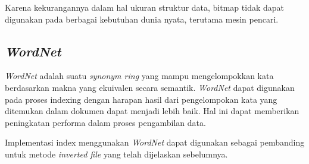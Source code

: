 Karena kekurangannya dalam hal ukuran struktur data, bitmap tidak dapat
digunakan pada berbagai kebutuhan dunia nyata, terutama mesin pencari.

\subsection{\emph{WordNet}}

\emph{WordNet} adalah suatu \emph{synonym ring} yang mampu mengelompokkan kata
berdasarkan makna yang ekuivalen secara semantik. \emph{WordNet} dapat digunakan
pada proses indexing dengan harapan hasil dari pengelompokan kata yang ditemukan
dalam dokumen dapat menjadi lebih baik. Hal ini dapat memberikan peningkatan
performa dalam proses pengambilan data.

Implementasi index menggunakan \emph{WordNet} dapat digunakan sebagai pembanding
untuk metode \emph{inverted file} yang telah dijelaskan sebelumnya.
